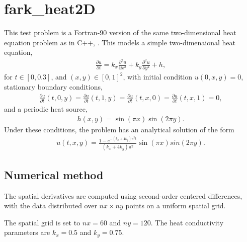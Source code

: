 \documentclass[letterpaper,10pt,english]{sphinxmanual}
\begin{document}
\section{fark\_heat2D}
\label{\detokenize{f90_parallel:fark-heat2d}}\label{\detokenize{f90_parallel:id1}}
This test problem is a Fortran-90 version of the same two-dimensional
heat equation problem as in C++, {\hyperref[\detokenize{cpp_parallel:ark-heat2d}]{}}.  This models a
simple two-dimenaional heat equation,
\begin{equation*}
\begin{split}\frac{\partial u}{\partial t} = k_x \frac{\partial^2 u}{\partial x^2}
                              + k_y \frac{\partial^2 u}{\partial y^2} + h,\end{split}
\end{equation*}
for \(t \in [0, 0.3]\), and \((x,y) \in [0, 1]^2\), with initial
condition \(u(0,x,y) = 0\), stationary boundary conditions,
\begin{equation*}
\begin{split}\frac{\partial u}{\partial t}(t,0,y) = \frac{\partial u}{\partial t}(t,1,y) =
\frac{\partial u}{\partial t}(t,x,0) = \frac{\partial u}{\partial t}(t,x,1) = 0,\end{split}
\end{equation*}
and a periodic heat source,
\begin{equation*}
\begin{split}h(x,y) = \sin(\pi x) \sin(2\pi y).\end{split}
\end{equation*}
Under these conditions, the problem has an analytical solution of the
form
\begin{equation*}
\begin{split}u(t,x,y) = \frac{1 - e^{-(k_x+4k_y)\pi^2 t}}{(k_x+4k_y)\pi^2} \sin(\pi x) sin(2\pi y).\end{split}
\end{equation*}

\subsection{Numerical method}
\label{\detokenize{f90_parallel:numerical-method}}
The spatial derivatives are computed using second-order centered
differences, with the data distributed over \(nx\times ny\) points
on a uniform spatial grid.

The spatial grid is set to \(nx=60\) and \(ny=120\).  The heat
conductivity parameters are \(k_x=0.5\) and \(k_y=0.75\).
\end{document}
